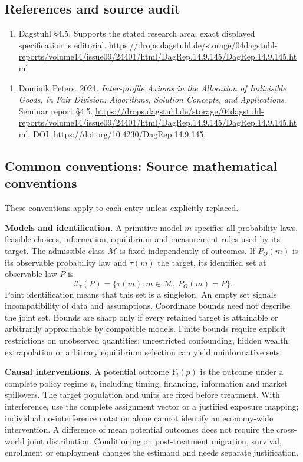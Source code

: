 \documentclass[11pt,a4paper]{article}
\begin{document}
\subsection*{References and source audit}
\begin{enumerate}
\item Dagstuhl §4.5. Supports the stated research area; exact displayed specification is editorial. \url{https://drops.dagstuhl.de/storage/04dagstuhl-reports/volume14/issue09/24401/html/DagRep.14.9.145/DagRep.14.9.145.html}
\end{enumerate}
\begin{enumerate}\raggedright
\item\hypertarget{definitions:source:30007560:1}{} Dominik Peters. 2024. \emph{Inter-profile Axioms in the Allocation of Indivisible Goods, in Fair Division: Algorithms, Solution Concepts, and Applications}. Seminar report §4.5.
\url{https://drops.dagstuhl.de/storage/04dagstuhl-reports/volume14/issue09/24401/html/DagRep.14.9.145/DagRep.14.9.145.html}.
DOI: \url{https://doi.org/10.4230/DagRep.14.9.145}.
\end{enumerate}

\subsection*{Common conventions: Source mathematical conventions}

These conventions apply to each entry unless explicitly replaced.

\textbf{Models and identification.} A primitive model \(m\) specifies all probability laws, feasible choices, information, equilibrium and measurement rules used by its target. The admissible class \(\mathcal M\) is fixed independently of outcomes. If \(P_O(m)\) is its observable probability law and \(\tau(m)\) the target, its identified set at observable law \(P\) is
\[
 \mathcal I_\tau(P)=\{\tau(m):m\in\mathcal M,\ P_O(m)=P\}.
\]
Point identification means that this set is a singleton. An empty set signals incompatibility of data and assumptions. Coordinate bounds need not describe the joint set. Bounds are sharp only if every retained target is attainable or arbitrarily approachable by compatible models. Finite bounds require explicit restrictions on unobserved quantities; unrestricted confounding, hidden wealth, extrapolation or arbitrary equilibrium selection can yield uninformative sets.

\textbf{Causal interventions.} A potential outcome \(Y_i(p)\) is the outcome under a complete policy regime \(p\), including timing, financing, information and market spillovers. The target population and units are fixed before treatment. With interference, use the complete assignment vector or a justified exposure mapping; individual no-interference notation alone cannot identify an economy-wide intervention. A difference of mean potential outcomes does not require the cross-world joint distribution. Conditioning on post-treatment migration, survival, enrollment or employment changes the estimand and needs separate justification.
\end{document}

